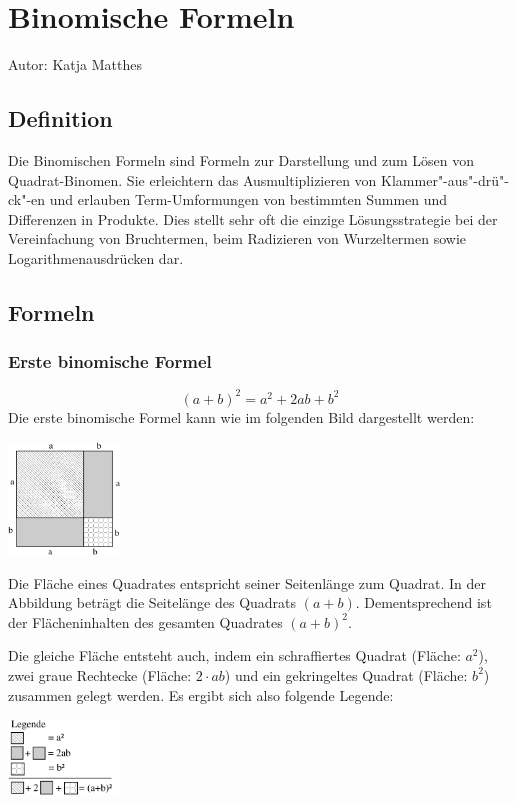 \section{Binomische Formeln}
\label{binomisch}
Autor: Katja Matthes
\subsection{Definition}
Die Binomischen Formeln sind Formeln zur Darstellung und zum Lösen von Quadrat-Binomen. Sie erleichtern das Ausmultiplizieren von Klammer"-aus"-drü"-ck"-en und erlauben Term-Umformungen von bestimmten Summen und Differenzen in Produkte. Dies stellt sehr oft die einzige Lösungsstrategie bei der Vereinfachung von Bruchtermen, beim Radizieren von Wurzeltermen sowie Logarithmenausdrücken dar.
\subsection{Formeln}
\subsubsection{Erste binomische Formel}
	\[(a + b)^2 = a^2 + 2ab + b^2\]
Die erste binomische Formel kann wie im folgenden Bild dargestellt werden:
\begin{center}
\includegraphics[height=3cm]{img/binF1.pdf}
\end{center}
Die Fläche eines Quadrates entspricht seiner Seitenlänge zum Quadrat. In der Abbildung beträgt die Seitelänge des Quadrats $ (a+b) $. Dementsprechend ist der Flächeninhalten des gesamten Quadrates $ (a+b)^2 $.

Die gleiche Fläche entsteht auch, indem ein schraffiertes Quadrat (Fläche: $ a^2 $), zwei graue Rechtecke (Fläche: $ 2\cdot ab $) und ein gekringeltes Quadrat (Fläche: $ b^2 $) zusammen gelegt werden. Es ergibt sich also folgende Legende: 
\begin{center}
\includegraphics[height=2cm]{img/binF1legende.pdf}
\end{center}
